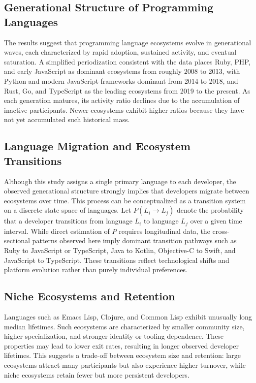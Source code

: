 \documentclass[12pt,a4paper]{article}
\begin{document}
\subsection{Generational Structure of Programming Languages}

The results suggest that programming language ecosystems evolve in generational waves, each characterized by rapid adoption, sustained activity, and eventual saturation. A simplified periodization consistent with the data places Ruby, PHP, and early JavaScript as dominant ecosystems from roughly 2008 to 2013, with Python and modern JavaScript frameworks dominant from 2014 to 2018, and Rust, Go, and TypeScript as the leading ecosystems from 2019 to the present. As each generation matures, its activity ratio declines due to the accumulation of inactive participants. Newer ecosystems exhibit higher ratios because they have not yet accumulated such historical mass.

\subsection{Language Migration and Ecosystem Transitions}

Although this study assigns a single primary language to each developer, the observed generational structure strongly implies that developers migrate between ecosystems over time. This process can be conceptualized as a transition system on a discrete state space of languages. Let $P(L_i \to L_j)$ denote the probability that a developer transitions from language $L_i$ to language $L_j$ over a given time interval. While direct estimation of $P$ requires longitudinal data, the cross-sectional patterns observed here imply dominant transition pathways such as Ruby to JavaScript or TypeScript, Java to Kotlin, Objective-C to Swift, and JavaScript to TypeScript. These transitions reflect technological shifts and platform evolution rather than purely individual preferences.

\subsection{Niche Ecosystems and Retention}

Languages such as Emacs Lisp, Clojure, and Common Lisp exhibit unusually long median lifetimes. Such ecosystems are characterized by smaller community size, higher specialization, and stronger identity or tooling dependence. These properties may lead to lower exit rates, resulting in longer observed developer lifetimes. This suggests a trade-off between ecosystem size and retention: large ecosystems attract many participants but also experience higher turnover, while niche ecosystems retain fewer but more persistent developers.
\end{document}
